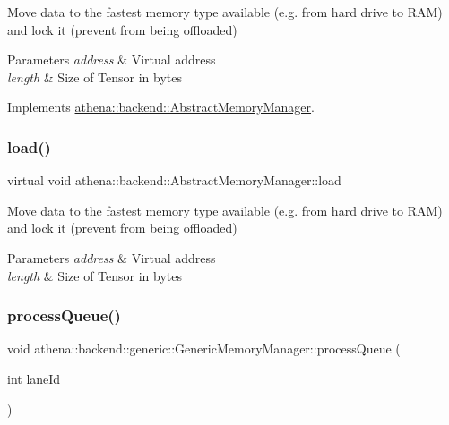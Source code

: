 Move data to the fastest memory type available (e.\+g. from hard drive to R\+AM) and lock it (prevent from being offloaded) 
\begin{DoxyParams}{Parameters}
{\em address} & Virtual address \\
\hline
{\em length} & Size of Tensor in bytes \\
\hline
\end{DoxyParams}


Implements \mbox{\hyperlink{classathena_1_1backend_1_1_abstract_memory_manager_af5d4fd46d1bd780edc638aea6b729ff3}{athena\+::backend\+::\+Abstract\+Memory\+Manager}}.

\mbox{\label{classathena_1_1backend_1_1generic_1_1_generic_memory_manager_af5d4fd46d1bd780edc638aea6b729ff3}} 
\subsubsection{\texorpdfstring{load()}{load()}\hspace{0.1cm}{\footnotesize\ttfamily [2/2]}}
{\footnotesize\ttfamily virtual void athena\+::backend\+::\+Abstract\+Memory\+Manager\+::load}

Move data to the fastest memory type available (e.\+g. from hard drive to R\+AM) and lock it (prevent from being offloaded) 
\begin{DoxyParams}{Parameters}
{\em address} & Virtual address \\
\hline
{\em length} & Size of Tensor in bytes \\
\hline
\end{DoxyParams}
\mbox{\label{classathena_1_1backend_1_1generic_1_1_generic_memory_manager_a978be661a46caaa8f6ef40a2c45a014e}} 
\subsubsection{\texorpdfstring{process\+Queue()}{processQueue()}}
{\footnotesize\ttfamily void athena\+::backend\+::generic\+::\+Generic\+Memory\+Manager\+::process\+Queue (\begin{DoxyParamCaption}\item[{int}]{lane\+Id }\end{DoxyParamCaption})\hspace{0.3cm}{\ttfamily [protected]}}

